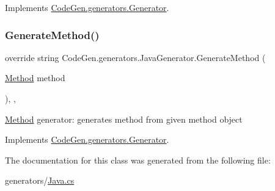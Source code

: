 Implements \mbox{\hyperlink{classCodeGen_1_1generators_1_1Generator_a0d1a48aedbca08c05af734a43739d1c3}{Code\+Gen.\+generators.\+Generator}}.

\mbox{\label{classCodeGen_1_1generators_1_1JavaGenerator_a01dca6b9662f50fbd4735dbe97c99cc2}} 
\subsubsection{\texorpdfstring{Generate\+Method()}{GenerateMethod()}}
{\footnotesize\ttfamily override string Code\+Gen.\+generators.\+Java\+Generator.\+Generate\+Method (\begin{DoxyParamCaption}\item[{\mbox{\hyperlink{classCodeGen_1_1generators_1_1Method}{Method}}}]{method }\end{DoxyParamCaption})\hspace{0.3cm}{\ttfamily [inline]}, {\ttfamily [protected]}, {\ttfamily [virtual]}}



\mbox{\hyperlink{classCodeGen_1_1generators_1_1Method}{Method}} generator\+: generates method from given method object  



Implements \mbox{\hyperlink{classCodeGen_1_1generators_1_1Generator_a04fc9bd217b3b8c3d5f7b1a3f92c79d3}{Code\+Gen.\+generators.\+Generator}}.



The documentation for this class was generated from the following file\+:\begin{DoxyCompactItemize}
\item 
generators/\mbox{\hyperlink{Java_8cs}{Java.\+cs}}\end{DoxyCompactItemize}
